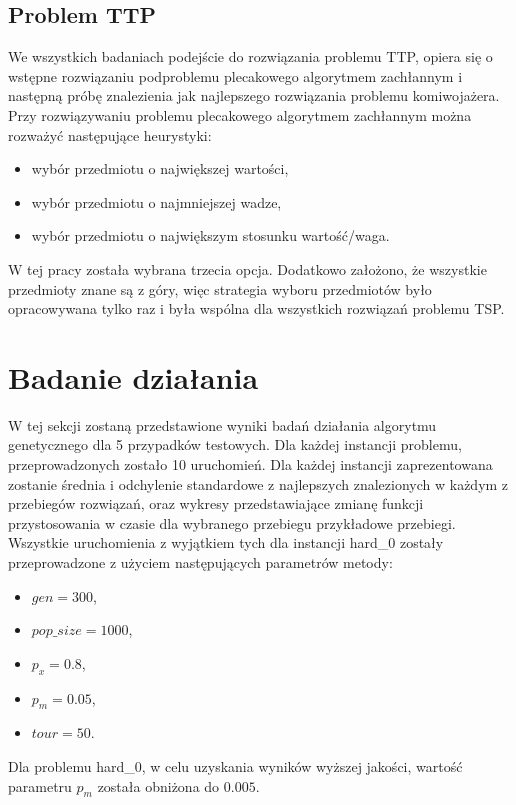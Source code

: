 \documentclass{article}
\begin{document}
	\subsection{Problem TTP}
	We wszystkich badaniach podejście do rozwiązania problemu TTP, opiera się o wstępne rozwiązaniu podproblemu plecakowego algorytmem zachłannym i następną próbę znalezienia jak najlepszego rozwiązania problemu komiwojażera.
	Przy rozwiązywaniu problemu plecakowego algorytmem zachłannym można rozważyć następujące heurystyki:
	\begin{itemize}
		\item wybór przedmiotu o największej wartości,
		\item wybór przedmiotu o najmniejszej wadze,
		\item wybór przedmiotu o największym stosunku wartość/waga.
	\end{itemize}
	W tej pracy została wybrana trzecia opcja. Dodatkowo założono, że wszystkie przedmioty znane są z góry, więc strategia wyboru przedmiotów było opracowywana tylko raz i była wspólna dla wszystkich rozwiązań problemu TSP.
	
	\section{Badanie działania}
	W tej sekcji zostaną przedstawione wyniki badań działania algorytmu genetycznego dla 5 przypadków testowych. Dla każdej instancji problemu, przeprowadzonych zostało 10 uruchomień. Dla każdej instancji zaprezentowana zostanie średnia i odchylenie standardowe z najlepszych znalezionych w każdym z przebiegów rozwiązań, oraz wykresy przedstawiające zmianę funkcji przystosowania w czasie dla wybranego przebiegu przykładowe przebiegi.
	Wszystkie uruchomienia z wyjątkiem tych dla instancji hard\_0 zostały przeprowadzone z użyciem następujących parametrów metody:
	\begin{itemize}
		\item $gen = 300$,
		\item $pop\_size = 1000$,
		\item $p_x = 0.8$,
		\item $p_m = 0.05$,
		\item $tour = 50$.
	\end{itemize}
	Dla problemu hard\_0, w celu uzyskania wyników wyższej jakości, wartość parametru $p_m$ została obniżona do $0.005$.
	
	
\end{document}
